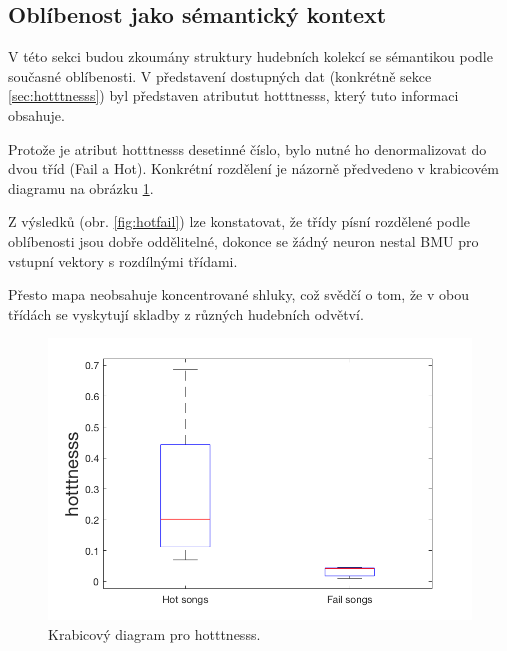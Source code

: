 \documentclass[thesis=M,czech]{FITthesis}[2012/06/26]
\begin{document}
\subsection{Oblíbenost jako sémantický kontext}\label{sec:hotness}
V této sekci budou zkoumány struktury hudebních kolekcí se sémantikou podle současné oblíbenosti. V představení dostupných dat (konkrétně sekce \ref{sec:hotttnesss}) byl představen atributut hotttnesss, který tuto informaci obsahuje.


Protože je atribut hotttnesss desetinné číslo, bylo nutné ho denormalizovat do dvou tříd (Fail a Hot). Konkrétní rozdělení je názorně předvedeno v krabicovém diagramu na obrázku \ref{fig:boxplot}.



Z výsledků (obr. \ref{fig:hotfail}) lze konstatovat, že třídy písní rozdělené podle oblíbenosti jsou dobře oddělitelné, dokonce se žádný neuron nestal BMU pro vstupní vektory s rozdílnými třídami.

Přesto mapa neobsahuje koncentrované shluky, což svědčí o tom, že v obou třídách se vyskytují skladby z různých hudebních odvětví.



\begin{figure}[htbp]
\begin{center}
	\includegraphics[scale=0.25]{exp_boxplot.png}
\caption{Krabicový diagram pro hotttnesss.}
\label{fig:boxplot}
\end{center}
\end{figure}

  
\end{document}
